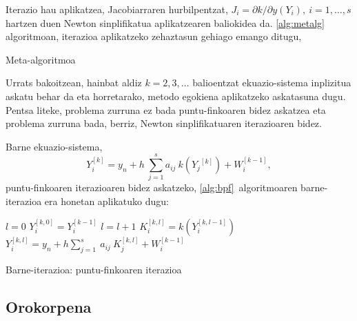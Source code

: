 Iterazio hau aplikatzea, Jacobiarraren hurbilpentzat, $J_i=\partial k/ \partial y (Y_i), \ i=1,\dots,s$ hartzen duen Newton sinplifikatua aplikatzearen baliokidea da. \ref{alg:metalg} algoritmoan, iterazioa aplikatzeko zehaztasun gehiago emango ditugu,
 
\begin{algorithm}[H]
 \caption{Meta-algoritmoa}
 \label{alg:metalg}
\end{algorithm}

Urrats bakoitzean, hainbat aldiz $k=2,3,\dots$ balioentzat ekuazio-sistema inplizitua askatu behar da eta horretarako, 
metodo egokiena aplikatzeko askatasuna dugu. Pentsa liteke,  problema zurruna ez bada puntu-finkoaren bidez askatzea eta problema zurruna bada, berriz,  Newton sinplifikatuaren iterazioaren bidez.

Barne ekuazio-sistema,
\begin{equation*}
 Y_i^{[k]}=y_n+h\  \sum^s_{j=1}{a_{ij}\ k({Y_j}^{[k]})+W^{[k-1]}_i},
\end{equation*}
puntu-finkoaren iterazioaren bidez askatzeko, \ref{alg:bpf}~algoritmoaren barne-iterazioa era honetan aplikatuko dugu: 

\begin{algorithm}[H]
 \BlankLine
  $l=0$\;
  $Y_{i}^{[k,0]}=Y_{i}^{[k-1]}$\;
  {
   \BlankLine
   $l=l+1$\;  
   \BlankLine
   $K_{i}^{[k,l]}=k(Y_{i}^{[k,l-1]})$\;
   $Y_{i}^{[k,l]}=y_{n} + h \sum\limits_{j=1}^{s} \ a_{ij} \ K_{j}^{[k,l]}  +  W_{i}^{[k-1]} $\;
  }
 \caption{Barne-iterazioa: puntu-finkoaren iterazioa}
 \label{alg:bpf}
\end{algorithm}


\subsection*{Orokorpena}

